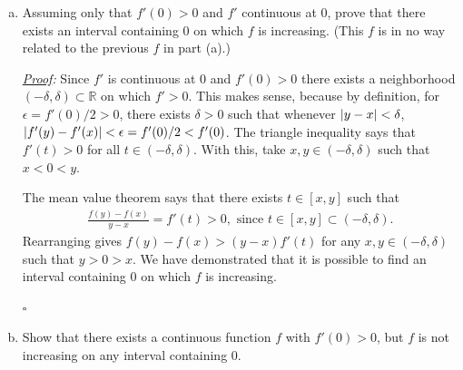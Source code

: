 \documentclass[11pt]{article}
\newcommand{\f}[2]{\frac{#1}{#2}}
\begin{document}
\begin{enumerate}[(a)]
	



	
	
	
	
	
	
	
	
	
	
	
	
	
	
	
	
	
	
	
	
	
	
	\item Assuming only that $f'(0) > 0$ and $f'$ continuous at $0$, prove that there exists an interval containing $0$ on which $f$ is increasing. (This $f$ is in no way related to the previous $f$ in part (a).)
	
	
	
	\noindent \textit{\underline{Proof}:} Since $f'$ is continuous at $0$ and $f'(0) > 0$ there exists a neighborhood $(-\delta,\delta) \subset \mathbb{R}$ on which $f' > 0$. This makes sense, because by definition, for $\epsilon = {f'(0)}/2 > 0$, there exists $\delta >0$ such that whenever $\abs{y-x} < \delta$, $\abs{f'(y) - f'(x)} < \epsilon = {f'(0)}/2 < f'(0)$. The triangle inequality says that $f'(t) > 0$ for all $t\in (-\delta, \delta)$. With this, take $x,y\in (-\delta,\delta)$ such that $x < 0 < y$.
	
	The mean value theorem says that there exists $t \in [x,y]$ such that 
	\begin{align*}
	\f{f(y) - f(x)}{y-x} = f'(t) > 0, \mbox{ since } t\in [x,y] \subset (-\delta,\delta).
	\end{align*}
	Rearranging gives $f(y) - f(x) > (y-x)f'(t)$ for any $x,y\in (-\delta,\delta)$ such that $y>0>x$. We have demonstrated that it is possible to find an interval containing $0$ on which $f$ is increasing.
	
	\hfill $\square$
	
	
	
	
	
	
	
	
	
	
	
	
	
	
	
	\item Show that there exists a continuous function $f$ with $f'(0) > 0$, but $f$ is not increasing on any interval containing $0$.
	

\end{enumerate}
\end{document}

